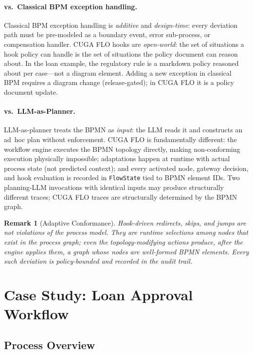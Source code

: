 \documentclass[11pt,a4paper]{article}
\newtheorem{remark}{Remark}
\begin{document}
\paragraph{vs.\ Classical BPM exception handling.}
Classical BPM exception handling is \emph{additive} and \emph{design-time}: every
deviation path must be pre-modeled as a boundary event, error sub-process, or
compensation handler. CUGA FLO hooks are \emph{open-world}: the set of situations
a hook policy can handle is the set of situations the policy document can reason
about. In the loan example, the regulatory rule is a markdown policy reasoned about
per case---not a diagram element. Adding a new exception in classical BPM requires
a diagram change (release-gated); in CUGA FLO it is a policy document update.

\paragraph{vs.\ LLM-as-Planner.}
LLM-as-planner treats the BPMN as \emph{input}: the LLM reads it and constructs
an ad~hoc plan without enforcement. CUGA FLO is fundamentally different: the
workflow engine executes the BPMN topology directly, making non-conforming
execution physically impossible; adaptations
happen at runtime with actual process state (not predicted context); and every
activated node, gateway decision, and hook evaluation is recorded in \texttt{FlowState}
tied to BPMN element IDs. Two planning-LLM invocations with identical inputs may
produce structurally different traces; CUGA FLO traces are structurally determined
by the BPMN graph.

\begin{remark}[Adaptive Conformance]
Hook-driven redirects, skips, and jumps are not violations of the process model.
They are runtime selections among nodes that exist in the process graph; even the
topology-modifying actions produce, after the engine applies them, a graph whose
nodes are well-formed BPMN elements. Every such deviation is policy-bounded and
recorded in the audit trail.
\end{remark}

\section{Case Study: Loan Approval Workflow}
\label{sec:casestudy}

\subsection{Process Overview}
\end{document}
